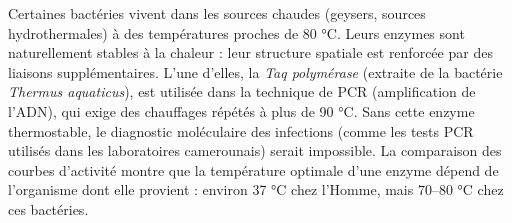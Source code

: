 \documentclass[11pt]{article}
\newcommand{\cle}[1]{{\popxbold\color{popdark}#1}}
\begin{document}
\begin{savaistu}
Certaines bactéries vivent dans les sources chaudes (geysers, sources hydrothermales) à des températures proches de 80 °C. Leurs enzymes sont naturellement stables à la chaleur : leur structure spatiale est renforcée par des liaisons supplémentaires. L'une d'elles, la \emph{Taq polymérase} (extraite de la bactérie \emph{Thermus aquaticus}), est utilisée dans la technique de \cle{PCR} (amplification de l'ADN), qui exige des chauffages répétés à plus de 90 °C. Sans cette enzyme thermostable, le diagnostic moléculaire des infections (comme les tests PCR utilisés dans les laboratoires camerounais) serait impossible. La comparaison des courbes d'activité montre que la température optimale d'une enzyme dépend de l'organisme dont elle provient : environ 37 °C chez l'Homme, mais 70--80 °C chez ces bactéries.
\end{savaistu}
\end{document}
